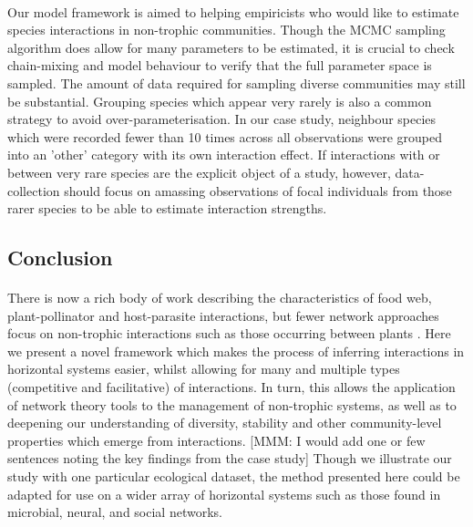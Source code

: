 \documentclass[a4,12pt]{article}
\begin{document}
        \paragraph{}
        Our model framework is aimed to helping empiricists who would like to estimate species interactions in non-trophic communities. Though the MCMC sampling algorithm does allow for many parameters to be estimated, it is crucial to check chain-mixing and model behaviour to verify that the full parameter space is sampled. The amount of data required for sampling diverse communities may still be substantial. Grouping species which appear very rarely is also a common strategy to avoid over-parameterisation. In our case study, neighbour species which were recorded fewer than 10 times across all observations were grouped into an 'other' category with its own interaction effect. If interactions with or between very rare species are the explicit object of a study, however, data-collection should focus on amassing observations of focal individuals from those rarer species to be able to estimate  interaction strengths.   

\subsection{Conclusion}

    \paragraph{} 
    There is now a rich body of work describing the characteristics of food web, plant-pollinator and host-parasite interactions, but fewer network approaches focus on non-trophic interactions such as those occurring between plants \parencite{Ellison2019}. Here we present a novel framework which makes the process of inferring  interactions in horizontal systems easier, whilst allowing for many and multiple types (competitive and facilitative) of interactions. In turn, this allows the application of  network theory tools to the management of non-trophic systems, as well as to deepening our understanding of diversity, stability and other community-level properties which emerge from interactions. [MMM: I would add one or few sentences noting the key findings from the case study] Though we illustrate our study with one particular ecological dataset, the method presented here could be adapted for use on a wider array of  horizontal systems such as those found in microbial, neural, and social networks. 
   
\end{document}
